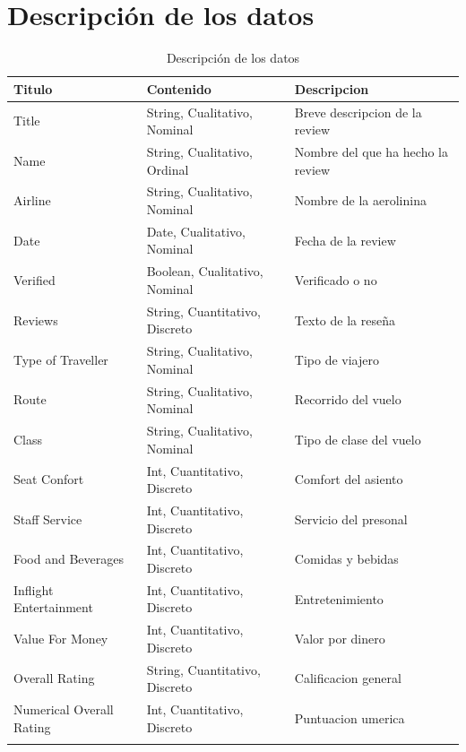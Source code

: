 \documentclass{report}
\begin{document}
        \section{Descripción de los datos}
            \begin{longtable}{|p{4cm}|p{}|p{}|}
                \hline
                \textbf{Titulo} & \textbf{Contenido}& \textbf{Descripcion}\\
                \hline
                Title & String, Cualitativo, Nominal & Breve descripcion de la review\\
                \hline
                Name & String, Cualitativo, Ordinal & Nombre del que ha hecho la review\\
                \hline
                Airline & String, Cualitativo, Nominal & Nombre de la aerolinina\\
                \hline
                Date & Date, Cualitativo, Nominal & Fecha de la review\\
                \hline
                Verified & Boolean, Cualitativo, Nominal & Verificado o no\\
                \hline
                Reviews & String, Cuantitativo, Discreto & Texto de la reseña\\
                \hline
                Type of Traveller & String, Cualitativo, Nominal & Tipo de viajero\\
                \hline
                Route & String, Cualitativo, Nominal & Recorrido del vuelo\\
                \hline
                Class & String, Cualitativo, Nominal & Tipo de clase del vuelo\\
                \hline
                Seat Confort & Int, Cuantitativo, Discreto & Comfort del asiento\\
                \hline
                Staff Service & Int, Cuantitativo, Discreto & Servicio del presonal\\
                \hline
                Food and Beverages & Int, Cuantitativo, Discreto & Comidas y bebidas\\
                \hline
                Inflight Entertainment & Int, Cuantitativo, Discreto & Entretenimiento\\
                \hline
                Value For Money & Int, Cuantitativo, Discreto & Valor por dinero\\
                \hline
                Overall Rating & String, Cuantitativo, Discreto & Calificacion general\\
                \hline
                Numerical Overall Rating & Int, Cuantitativo, Discreto & Puntuacion umerica\\
                \hline
                \caption{Descripción de los datos}
            \end{longtable}
\end{document}
